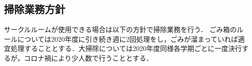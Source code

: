 \subsection*{掃除業務方針}


サークルルームが使用できる場合は以下の方針で掃除業務を行う．
ごみ箱のルールについては2020年度に引き続き週に2回処理をし，ごみが溜まっていれば適宜処理することとする．大掃除については2020年度同様各学期ごとに一度決行するが，コロナ禍により少人数で行うこととする．

